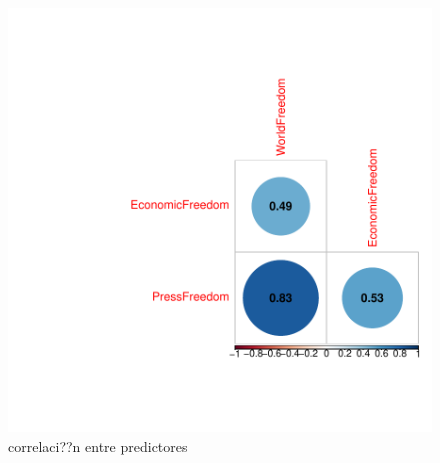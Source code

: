 \begin{figure}[h]
\centering
\begin{adjustbox}{width=7cm,height=7cm,clip,trim=1.5cm 0.5cm 0cm 1.5cm}
\includegraphics{paperVersion_7_bivariada-corrPlotX}
\end{adjustbox}
\caption{correlaci??n entre predictores}
\label{corrPlotX}
\end{figure}



\endinput

